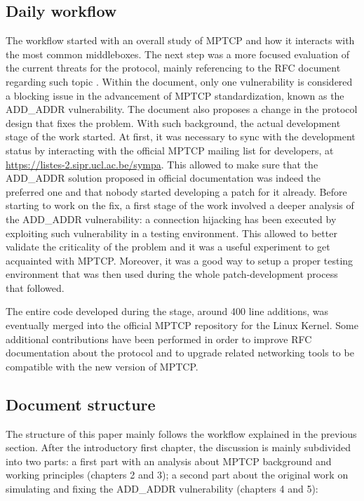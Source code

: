 \subsection{Daily workflow}
The workflow started with an overall study of MPTCP and how it interacts with the most common middleboxes. The next step was a more focused evaluation of the current threats for the protocol, mainly referencing to the RFC document regarding such topic \cite{rfc7430}. Within the document, only one vulnerability is considered a blocking issue in the advancement of MPTCP standardization, known as the ADD\_ADDR vulnerability. The document also proposes a change in the protocol design that fixes the problem. With such background, the actual development stage of the work started. At first, it was necessary to sync with the development status by interacting with the official MPTCP mailing list for developers, at \url{https://listes-2.sipr.ucl.ac.be/sympa}. This allowed to make sure that the ADD\_ADDR solution proposed in official documentation \cite{rfc7430} was indeed the preferred one and that nobody started developing a patch for it already.
Before starting to work on the fix, a first stage of the work involved a deeper analysis of the ADD\_ADDR vulnerability: a connection hijacking has been executed by exploiting such vulnerability in a testing environment. This allowed to better validate the criticality of the problem and it was a useful experiment to get acquainted with MPTCP. Moreover, it was a good way to setup a proper testing environment that was then used during the whole patch-development process that followed.

The entire code developed during the stage, around 400 line additions, was eventually merged into the official MPTCP repository for the Linux Kernel. Some additional contributions have been performed in order to improve RFC documentation about the protocol and to upgrade related networking tools to be compatible with the new version of MPTCP.

\subsection{Document structure}
The structure of this paper mainly follows the workflow explained in the previous section. After the introductory first chapter, the discussion is mainly subdivided into two parts: a first part with an analysis about MPTCP background and working principles (chapters 2 and 3); a second part about the original work on simulating and fixing the ADD\_ADDR vulnerability (chapters 4 and 5):


